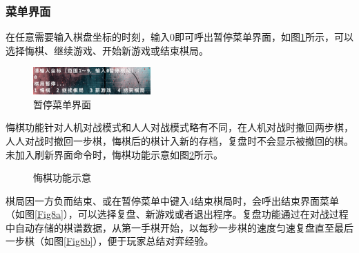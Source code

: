 \documentclass[twocolumn]{article}
\begin{document}
\subsubsection{菜单界面}
在任意需要输入棋盘坐标的时刻，输入0即可呼出暂停菜单界面，如图\ref{Fig6}所示，可以选择悔棋、继续游戏、开始新游戏或结束棋局。
\begin{figure}[H]
\centering
\includegraphics[width=0.4\textwidth]{fig8}
\caption{暂停菜单界面}
\label{Fig6}
\end{figure}
悔棋功能针对人机对战模式和人人对战模式略有不同，在人机对战时撤回两步棋，人人对战时撤回一步棋，悔棋后的棋计入新的存档，复盘时不会显示被撤回的棋。未加入刷新界面命令时，悔棋功能示意如图\ref{Fig7}所示。
\begin{figure}[H]
\centering
{}
\caption{悔棋功能示意}
\label{Fig7}
\end{figure}
棋局因一方负而结束、或在暂停菜单中键入4结束棋局时，会呼出结束界面菜单（如图\ref{Fig8a}），可以选择复盘、新游戏或者退出程序。复盘功能通过在对战过程中自动存储的棋谱数据，从第一手棋开始，以每秒一步棋的速度匀速复盘直至最后一步棋（如图\ref{Fig8b}），便于玩家总结对弈经验。
\end{document}
